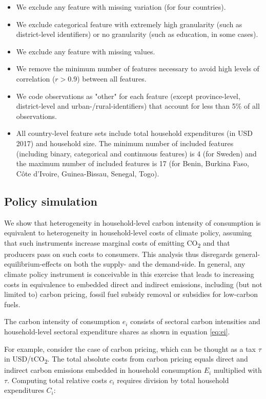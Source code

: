 \documentclass[12pt, a4paper]{article}
\begin{document}
\begin{refsection}
\begin{itemize}
    \item We exclude any feature with missing variation (for four countries).
    \item We exclude categorical feature with extremely high granularity (such as district-level identifiers) or no granularity (such as education, in some cases).
    \item We exclude any feature with missing values.
    \item We remove the minimum number of features necessary to avoid high levels of correlation ($r>0.9$) between all features.
    \item We code observations as "other" for each feature (except province-level, district-level and urban-/rural-identifiers) that account for less than 5\% of all observations.
    \item All country-level feature sets include total household expenditures (in USD 2017) and household size. The minimum number of included features (including binary, categorical and continuous features) is 4 (for Sweden) and the maximum number of included features is 17 (for Benin, Burkina Faso, Côte d'Ivoire, Guinea-Bissau, Senegal, Togo).
\end{itemize}

\subsection{Policy simulation}\label{sec:policysimulation}

We show that heterogeneity in household-level carbon intensity of consumption is equivalent to heterogeneity in household-level costs of climate policy, assuming that such instruments increase marginal costs of emitting CO\textsubscript{2} and that producers pass on such costs to consumers. This analysis thus disregards general-equilibrium-effects on both the supply- and the demand-side. In general, any climate policy instrument is conceivable in this exercise that leads to increasing costs in equivalence to embedded direct and indirect emissions, including (but not limited to) carbon pricing, fossil fuel subsidy removal or subsidies for low-carbon fuels.

The carbon intensity of consumption $e_{i}$ consists of sectoral carbon intensities and household-level sectoral expenditure shares as shown in equation \ref{eq:ei}. 

For example, consider the case of carbon pricing, which can be thought as a tax $\tau$ in USD/tCO\textsubscript{2}. The total absolute costs from carbon pricing equals direct and indirect carbon emissions embedded in household consumption $E_{i}$ multiplied with $\tau$. Computing total relative costs $c_{i}$ requires division by total household expenditures $C_{i}$:


\end{refsection}
\end{document}
